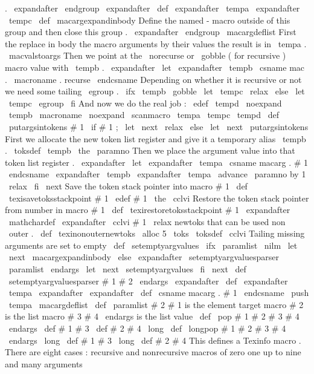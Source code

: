 {{{{{.
\
expandafter
\
endgroup
\
expandafter
\
def
\
expandafter
\
tempa
\
expandafter
{
\
tempc
}
%
}
\
def
\
macargexpandinbody
{
%
%
%
Define
the
named
-
macro
outside
of
this
group
and
then
close
this
group
.
\
expandafter
\
endgroup
\
macargdeflist
%
First
the
replace
in
body
the
macro
arguments
by
their
values
the
result
%
is
in
\
tempa
.
\
macvalstoargs
%
Then
we
point
at
the
\
norecurse
or
\
gobble
(
for
recursive
)
macro
value
%
with
\
tempb
.
\
expandafter
\
let
\
expandafter
\
tempb
\
csname
mac
.
\
macroname
.
recurse
\
endcsname
%
Depending
on
whether
it
is
recursive
or
not
we
need
some
tailing
%
\
egroup
.
\
ifx
\
tempb
\
gobble
\
let
\
tempc
\
relax
\
else
\
let
\
tempc
\
egroup
\
fi
%
And
now
we
do
the
real
job
:
\
edef
\
tempd
{
\
noexpand
\
tempb
{
\
macroname
}
\
noexpand
\
scanmacro
{
\
tempa
}
\
tempc
}
%
\
tempd
}
\
def
\
putargsintokens
#
1
{
%
\
if
#
1
;
\
let
\
next
\
relax
\
else
\
let
\
next
\
putargsintokens
%
First
we
allocate
the
new
token
list
register
and
give
it
a
temporary
%
alias
\
tempb
.
\
toksdef
\
tempb
\
the
\
paramno
%
Then
we
place
the
argument
value
into
that
token
list
register
.
\
expandafter
\
let
\
expandafter
\
tempa
\
csname
macarg
.
#
1
\
endcsname
\
expandafter
\
tempb
\
expandafter
{
\
tempa
}
%
\
advance
\
paramno
by
1
\
relax
\
fi
\
next
}
%
Save
the
token
stack
pointer
into
macro
#
1
\
def
\
texisavetoksstackpoint
#
1
{
\
edef
#
1
{
\
the
\
cclvi
}
}
%
Restore
the
token
stack
pointer
from
number
in
macro
#
1
\
def
\
texirestoretoksstackpoint
#
1
{
\
expandafter
\
mathchardef
\
expandafter
\
cclvi
#
1
\
relax
}
%
newtoks
that
can
be
used
non
\
outer
.
\
def
\
texinonouternewtoks
{
\
alloc
5
\
toks
\
toksdef
\
cclvi
}
%
Tailing
missing
arguments
are
set
to
empty
\
def
\
setemptyargvalues
{
%
\
ifx
\
paramlist
\
nilm
\
let
\
next
\
macargexpandinbody
\
else
\
expandafter
\
setemptyargvaluesparser
\
paramlist
\
endargs
\
let
\
next
\
setemptyargvalues
\
fi
\
next
}
\
def
\
setemptyargvaluesparser
#
1
#
2
\
endargs
{
%
\
expandafter
\
def
\
expandafter
\
tempa
\
expandafter
{
%
\
expandafter
\
def
\
csname
macarg
.
#
1
\
endcsname
{
}
}
%
\
push
\
tempa
\
macargdeflist
\
def
\
paramlist
{
#
2
}
%
}
%
#
1
is
the
element
target
macro
%
#
2
is
the
list
macro
%
#
3
#
4
\
endargs
is
the
list
value
\
def
\
pop
#
1
#
2
#
3
#
4
\
endargs
{
%
\
def
#
1
{
#
3
}
%
\
def
#
2
{
#
4
}
%
}
\
long
\
def
\
longpop
#
1
#
2
#
3
#
4
\
endargs
{
%
\
long
\
def
#
1
{
#
3
}
%
\
long
\
def
#
2
{
#
4
}
%
}
%
This
defines
a
Texinfo
macro
.
There
are
eight
cases
:
recursive
and
%
nonrecursive
macros
of
zero
one
up
to
nine
and
many
arguments
}}}}
